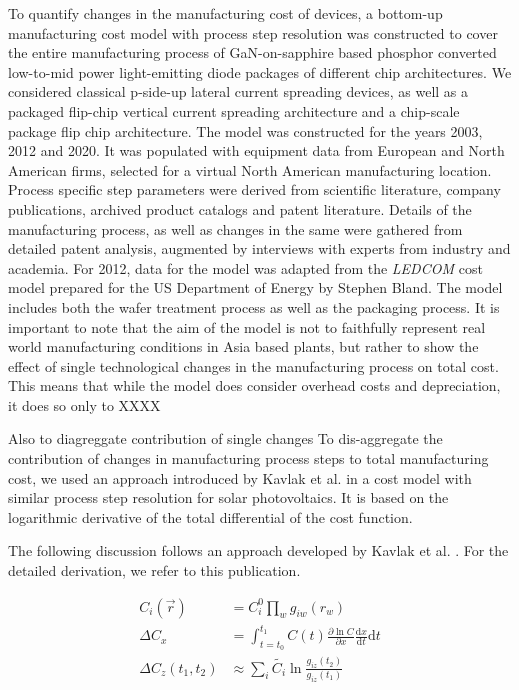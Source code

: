 \documentclass[a4paper,nocompress]{spie}  %
\begin{document}
To quantify changes in the manufacturing cost of devices, a bottom-up manufacturing cost model with process step resolution was constructed to cover the entire manufacturing process of GaN-on-sapphire based phosphor converted low-to-mid power light-emitting diode packages of different chip architectures. We considered classical p-side-up lateral current spreading devices, as well as a packaged flip-chip vertical current spreading architecture and a chip-scale package flip chip architecture. The model was constructed for the years 2003, 2012 and 2020. It was populated with equipment data from European and North American firms, selected for a virtual North American manufacturing location. Process specific step parameters were derived from scientific literature, company publications, archived product catalogs and patent literature. Details of the manufacturing process, as well as changes in the same were gathered from detailed patent analysis, augmented by interviews with experts from industry and academia. For 2012, data for the model was adapted from the \textit{LEDCOM} cost model prepared for the US Department of Energy by Stephen Bland. The model includes both the wafer treatment process as well as the packaging process. It is important to note that the aim of the model is not to faithfully represent real world manufacturing conditions in Asia based plants, but rather to show the effect of single technological changes in the manufacturing process on total cost. This means that while the model does consider overhead costs and depreciation, it does so only to XXXX 

Also to diagreggate contribution of single changes
To dis-aggregate the contribution of changes in manufacturing process steps to total manufacturing cost, we used an approach introduced by Kavlak et al. in a cost model with similar process step resolution for solar photovoltaics. It is based on the logarithmic derivative of the total differential of the cost function.

The following discussion follows an approach developed by Kavlak et al. \cite{kavlak2018evaluating}. For the detailed derivation, we refer to this publication.

    \begin{align}
        C_i(\vec{r}) &= C_i^0 \prod_w g_{iw}(r_w) \\
        \Delta C_x &= \int_{t=t_0}^{t_1} C(t) \frac{ \partial \ln C }{ \partial x } \frac{ \text{d} x }{ \text{d} t} \text{d} t \\
        \Delta C_z (t_1,t_2) &\approx \sum_i \tilde{C_i} \ln \frac{g_{iz}(t_2)}{g_{iz}(t_1)}
    \end{align}
    
\end{document}
